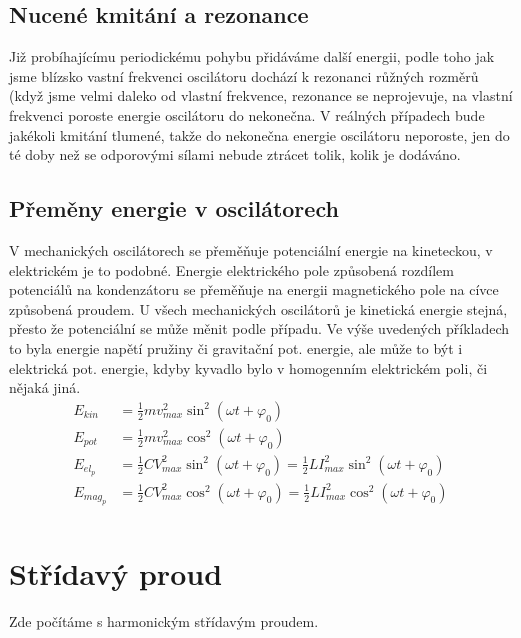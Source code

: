 \documentclass[titlepage]{report}
\begin{document}
\section{Nucené kmitání a rezonance}
Již probíhajícímu periodickému pohybu přidáváme další energii, podle toho jak jsme blízsko vastní frekvenci oscilátoru dochází k rezonanci růžných rozměrů (když jsme velmi daleko od vlastní frekvence, rezonance se neprojevuje, na vlastní frekvenci poroste energie oscilátoru do nekonečna. V reálných případech bude jakékoli kmitání tlumené, takže do nekonečna energie oscilátoru neporoste, jen do té doby než se odporovými sílami nebude ztrácet tolik, kolik je dodáváno.
\section{Přeměny energie v oscilátorech}
V mechanických oscilátorech se přeměňuje potenciální energie na kineteckou, v elektrickém je to podobné. Energie elektrického pole způsobená rozdílem potenciálů na kondenzátoru se přeměňuje na energii magnetického pole na cívce způsobená proudem. U všech mechanických oscilátorů je kinetická energie stejná, přesto že potenciální se může měnit podle případu. Ve výše uvedených příkladech to byla energie napětí pružiny či gravitační pot. energie, ale může to být i elektrická pot. energie, kdyby kyvadlo bylo v homogenním elektrickém poli, či nějaká jiná.\\
\begin{align}
E_{kin} &= \frac{1}{2} m v_{max}^2 \sin^2(\omega t + \varphi_0)\\
E_{pot} &= \frac{1}{2} m v_{max}^2 \cos^2(\omega t + \varphi_0)\\
E_{el_p} &= \frac{1}{2} C V_{max}^2 \sin^2(\omega t + \varphi_0) = \frac{1}{2} L I_{max}^2 \sin^2(\omega t + \varphi_0)\\
E_{mag_p} &= \frac{1}{2} C V_{max}^2 \cos^2(\omega t + \varphi_0) = \frac{1}{2} L I_{max}^2 \cos^2(\omega t + \varphi_0)\\
\end{align}
\chapter{Střídavý proud}
Zde počítáme s harmonickým střídavým proudem.
\end{document}
